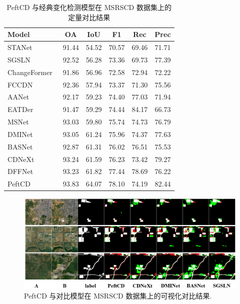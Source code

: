 \begin{table}[!htbp]
\centering
\caption{PeftCD 与经典变化检测模型在 MSRSCD 数据集上的定量对比结果}
\label{tab:peftcd_msrscd}
\begin{tabular}{l c c c c c}
\toprule
\textbf{Model} & \textbf{OA} & \textbf{IoU} & \textbf{F1} & \textbf{Rec} & \textbf{Prec} \\
\midrule
STANet~\cite{chen_spatial-temporal_2020} & 91.44 & 54.52 & 70.57 & 69.46 & 71.71 \\
SGSLN~\cite{zhao_exchanging_2023} & 92.52 & 56.28 & 73.36 & 69.73 & 77.39 \\
ChangeFormer~\cite{bandara2022transformer} & 91.86 & 56.96 & 72.58 & 72.94 & 72.22 \\
FCCDN~\cite{Chen2021FCCDNFC} & 92.36 & 57.94 & 73.37 & 71.30 & 75.56 \\
AANet~\cite{Hang2024AANetAA} & 92.17 & 59.23 & 74.40 & 77.03 & 71.94 \\
EATDer~\cite{Ma2024EATDerEA} & 91.47 & 59.29 & 74.44 & 84.17 & 66.73 \\
MSNet~\cite{Liu2025NetworkAD} & 93.03 & 59.80 & 75.74 & 74.73 & 76.79 \\
DMINet~\cite{feng_change_2023} & 93.05 & 61.24 & 75.96 & 74.37 & 77.63 \\
BASNet~\cite{z_wang_bitemporal_2024} & 92.87 & 61.31 & 76.02 & 76.51 & 75.53 \\
CDNeXt~\cite{wei_robust_2024} & 93.24 & 61.59 & 76.23 & 73.42 & 79.27 \\
DFFNet~\cite{Liu2025FullScaleCD} & 93.23 & 61.82 & 77.44 & 78.69 & 76.22 \\
\midrule
PeftCD & 93.83 & 64.07 & 78.10 & 74.19 & 82.44 \\
\bottomrule
\end{tabular}
\end{table}


\begin{figure}[!htbp]
  \centering
  \includegraphics[width=\textwidth]{paper_figures/基于AI基础模型微调的变化检测模型研究/PeftCD/peftcd_msrscd.png}
  \caption{PeftCD 与对比模型在 MSRSCD 数据集上的可视化对比结果.}
  \label{fig:peftcd_msrscd}
\end{figure}



